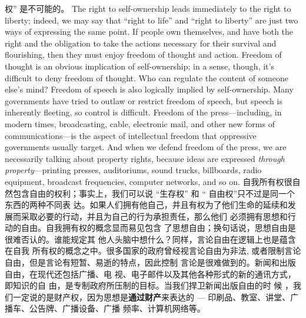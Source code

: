 \begin{paracol}{2}
权” 是不可能的。
\switchcolumn*
The right to self-ownership leads immediately to the right to
liberty; indeed, we may say that ``right to life'' and ``right to liberty'' are just two ways of expressing the same point. If people
own themselves, and have both the right and the obligation to
take the actions necessary for their survival and flourishing,
then they must enjoy freedom of thought and action. Freedom
of thought is an obvious implication of self-ownership; in a
sense, though, it's difficult to deny freedom of thought. Who
can regulate the content of someone else's mind? Freedom of
speech is also logically implied by self-ownership. Many governments have tried to outlaw or restrict freedom of speech, but
speech is inherently fleeting, so control is difficult. Freedom of
the press---including, in modern times, broadcasting, cable,
electronic mail, and other new forms of communications---is
the aspect of intellectual freedom that oppressive governments
usually target. And when we defend freedom of the press, we
are necessarily talking about property rights, because ideas are
expressed \textit{through property}---printing presses, auditoriums,
sound trucks, billboards, radio equipment, broadcast frequencies, computer networks, and so on.
\switchcolumn
自我所有权很自然包含自由的权利；事实上，我们可以说
“生存权” 和 “ 自由权”只不过是同一个东西的两种不同表
达。如果人们拥有他自己，并且有权为了他们生命的延续和发
展而采取必要的行动，并且为自己的行为承担责任，那么他们
必须拥有思想和行动的自由。自我拥有权的概念显而易见包含
了思想自由；换句话说，思想自由是很难否认的。谁能规定其
他人头脑中想什么？同样，言论自由在逻辑上也是蕴含在自我
所有权的概念之中。很多国家的政府曾经视言论自由为非法,
或者限制言论自由，但是言论有短暂、易逝的特点，因此控制
言论是很难做到的。新闻和出版自由，在现代还包括广播、电
视、电子邮件以及其他各种形式的新的通讯方式，即知识的自
由，是专制政府所压制的目标。当我们捍卫新闻出版自由的时
候 ，我们一定说的是财产权，因为思想是\textbf{通过财产}来表达的
--- 印刷品、教室、讲堂、广播车、公告牌、广播设备、广播
频率、计算机网络等。


\end{paracol}

